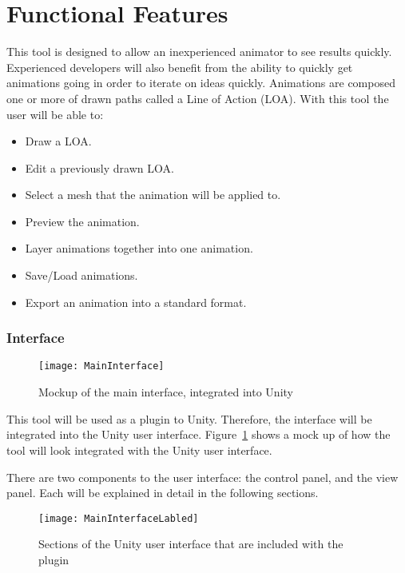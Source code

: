 \section{Functional Features}
	This tool is designed to allow an inexperienced animator to see results quickly.  Experienced developers will also benefit from the ability to quickly get animations going in order to iterate on ideas quickly.  
	Animations are composed one or more of drawn paths called a Line of Action (LOA).  With this tool the user will be able to:
\begin{itemize}
	\item Draw a LOA.
	\item Edit a previously drawn LOA.
	\item Select a mesh that the animation will be applied to.
	\item Preview the animation.
	\item Layer animations together into one animation.
	\item Save/Load animations.
	\item Export an animation into a standard format.
\end{itemize}
\subsubsection{Interface}
\begin{figure}[H]
\centering
\texttt{[image: MainInterface]}
\caption{Mockup of the main interface, integrated into Unity}
\label{fig:interface}
\end{figure}
This tool will be used as a plugin to Unity.  Therefore, the interface will be integrated into the Unity user interface.  Figure~\ref{fig:interface} shows a mock up of how the tool will look integrated with the Unity user interface.

There are two components to the user interface: the control panel, and the view panel.  Each will be explained in detail in the following sections.
\begin{figure}[H]
\centering
\texttt{[image: MainInterfaceLabled]}
\caption{Sections of the Unity user interface that are included with the plugin}
\label{fig:interfaceLabled}
\end{figure}
